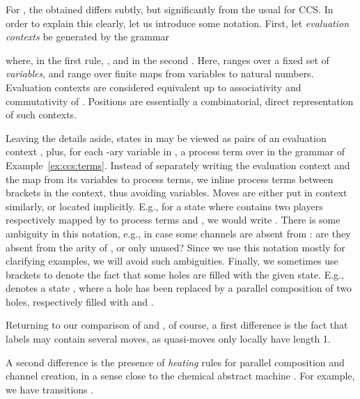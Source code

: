 \documentclass{LMCS}
\theoremstyle{plain}\newtheorem{satz}[thm]{Satz}
\begin{document}
\begin{exa}\label{ex:ltsccs}
  For , the obtained \lts{} differs subtly, but significantly
  from the usual \lts{} for CCS. In order to explain this clearly, let
  us introduce some notation. First, let \emph{evaluation contexts} be
  generated by the grammar
  where, in the first rule, , and in the
  second .  Here, 
  ranges over a fixed set of \emph{variables}, and 
  range over finite maps from variables to natural numbers. Evaluation
  contexts are considered equivalent up to associativity and
  commutativity of .  Positions are essentially a combinatorial,
  direct representation of such contexts.

  Leaving the details aside, states in  may be viewed as
  pairs  of an evaluation context , plus, for each -ary
  variable  in , a process term over  in
  the grammar of Example~\ref{ex:ccs:terms}.  Instead of separately
  writing the evaluation context and the map from its variables to
  process terms, we inline process terms between brackets in the
  context, thus avoiding variables. Moves are either put in context
  similarly, or located implicitly. E.g., for a state  where
   contains two players respectively mapped by  to process terms
   and , we would write . There is some ambiguity in
  this notation, e.g., in case some channels are absent from : are
  they absent from the arity of , or only unused? Since we use this
  notation mostly for clarifying examples, we will avoid such
  ambiguities.  Finally, we sometimes use brackets to denote the fact
  that some holes are filled with the given state. E.g., 
  denotes a state , where a hole has been replaced by a parallel
  composition of two holes, respectively filled with  and .

  Returning to our comparison of  and , of course,
  a first difference is the fact that labels may contain several
  moves, as quasi-moves only locally have length 1.

  A second difference is the presence of \emph{heating} rules for
  parallel composition and channel creation, in a sense close to the
  chemical abstract machine \citep{DBLP:conf/popl/BerryB90}.  For
  example, we have transitions .


\end{exa}
\end{document}

